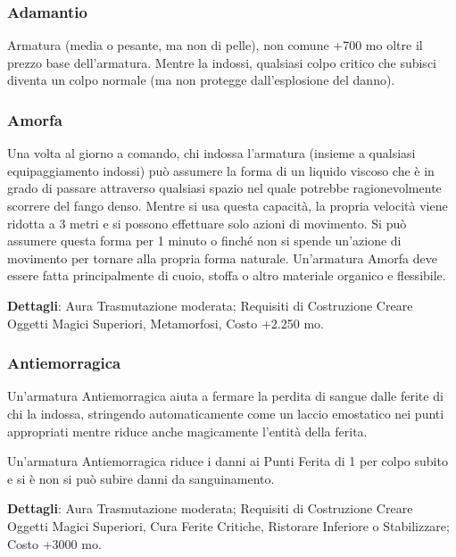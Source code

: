\begin{multicols}{2}
\subsubsection*{Adamantio}

Armatura (media o pesante, ma non di pelle), non comune +700 mo oltre il prezzo base dell'armatura. Mentre la indossi, qualsiasi colpo critico che subisci diventa un colpo normale (ma non protegge dall'esplosione del danno).


\subsubsection*{Amorfa}

Una volta al giorno a comando, chi indossa l'armatura (insieme a qualsiasi equipaggiamento indossi) può assumere la forma di un liquido viscoso che è in grado di passare attraverso qualsiasi spazio nel quale potrebbe ragionevolmente scorrere del fango denso. Mentre si usa questa capacità, la propria velocità viene ridotta a 3 metri e si possono effettuare solo azioni di movimento. Si può assumere questa forma per 1 minuto o finché non si spende un'azione di movimento per tornare alla propria forma naturale. Un'armatura Amorfa deve essere fatta principalmente di cuoio, stoffa o altro materiale organico e flessibile.

\textbf{Dettagli}: Aura Trasmutazione moderata; Requisiti di Costruzione Creare Oggetti Magici Superiori, Metamorfosi, Costo +2.250 mo.


\subsubsection*{Antiemorragica}

Un'armatura Antiemorragica aiuta a fermare la perdita di sangue dalle ferite di chi la indossa, stringendo automaticamente come un laccio emostatico nei punti appropriati mentre riduce anche magicamente l'entità della ferita.

Un'armatura Antiemorragica riduce i danni ai Punti Ferita di 1 per colpo subito e si è non si può subire danni da sanguinamento.

\textbf{Dettagli}: Aura Trasmutazione moderata; Requisiti di Costruzione Creare Oggetti Magici Superiori, Cura Ferite Critiche, Ristorare Inferiore o Stabilizzare; Costo +3000 mo.


\end{multicols}
